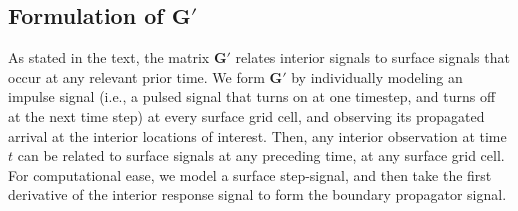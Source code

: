 \documentclass[draft]{agujournal2019}
\begin{document}
\subsection{Formulation of $\mathbf{G\prime}$ \label{sec:Gprime}}
As stated in the text, the matrix $\mathbf{G\prime}$ relates interior signals to surface signals that occur at any relevant prior time. We form $\mathbf{G\prime}$ by individually modeling an impulse signal (i.e., a pulsed signal that turns on at one timestep, and turns off at the next time step) at every surface grid cell, and observing its propagated arrival at the interior locations of interest. Then, any interior observation at time $t$ can be related to surface signals at any preceding time, at any surface grid cell. For computational ease, we model a surface step-signal, and then take the first derivative of the interior response signal to form the boundary propagator signal. 
\end{document}
